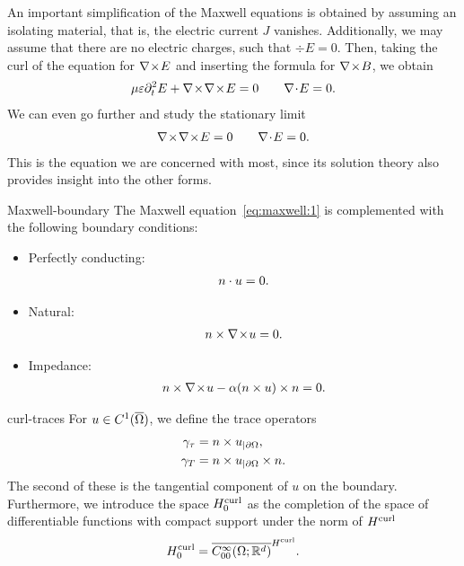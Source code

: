 \begin{intro}
  An important simplification of the Maxwell equations is obtained by
  assuming an isolating material, that is, the electric current $J$
  vanishes. Additionally, we may assume that there are no electric
  charges, such that $\div E=0$. Then, taking the curl of the equation
  for $\nabla\!\times\! E$ and inserting the formula for $\nabla\!\times\! B$, we obtain
  \begin{gather}
    \mu\varepsilon \partial_t^2 E + \nabla\!\times\!\nabla\!\times\! E = 0
    \qquad \nabla\!\cdot\! E=0.
  \end{gather}
  We can even go further and study the stationary limit
  \begin{gather}
    \label{eq:maxwell:1}
    \nabla\!\times\!\nabla\!\times\! E=0 \qquad \nabla\!\cdot\! E=0.
  \end{gather}
  This is the equation we are concerned with most, since its solution
  theory also provides insight into the other forms.
\end{intro}


\begin{Definition}{Maxwell-boundary}
  The Maxwell equation~\eqref{eq:maxwell:1} is complemented with the
  following boundary conditions:
  \begin{itemize}
  \item Perfectly conducting:
    \begin{gather}
      n\cdot u = 0.
    \end{gather}
    \item Natural:
      \begin{gather}
        n\times \nabla\!\times\! u = 0.
      \end{gather}
    \item Impedance:
      \begin{gather}
        n\times \nabla\!\times\! u - \alpha  (n\times u) \times n = 0.
      \end{gather}
  \end{itemize}
\end{Definition}


\begin{Definition}{curl-traces}
  For $u\in C^1(\overline{\Omega})$, we define the trace operators
  \begin{gather}
    \label{eq:maxwell:4}
    \begin{split}
      \gamma_{\tau} &= n\times u_{|\partial\Omega}, \\
      \gamma_{T} &= n\times u_{|\partial\Omega} \times n.\\
    \end{split}
  \end{gather}
  The second of these is the tangential component of $u$ on the
  boundary. Furthermore, we introduce the space $H^{\text{curl}}_0$ as the
  completion of the space of differentiable functions with compact
  support under the norm of $H^{\text{curl}}$
  \begin{gather}
    H^{\text{curl}}_0 = \overline{C^\infty_{00}(\Omega;\mathbb R^d)}^{H^{\text{curl}}}.
  \end{gather}
\end{Definition}


